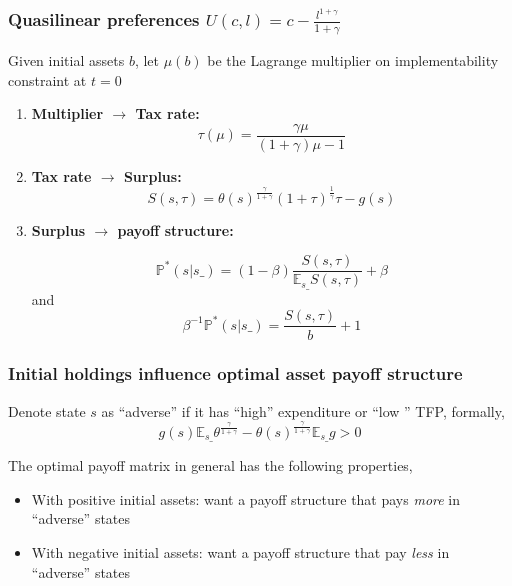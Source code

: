 \documentclass{beamer}
\newcommand{\EE}{\mathbb E}
\begin{document}
% 
\begin{frame}
\frametitle{Quasilinear preferences $U(c,l)=c-\frac{l^{1+\gamma}}{1+\gamma}$}
Given initial assets $b$,  let $\mu(b)$ be the Lagrange multiplier on implementability constraint
at $t =0$
\begin{enumerate}

 \item \textbf{Multiplier $\to$ Tax rate:}
 \[
		\tau(\mu) = \frac{\gamma\mu}{(1+\gamma)\mu-1}
	\]
 \item \textbf{Tax rate $\to$ Surplus:}
 \[
		S(s,\tau) = \theta(s)^\frac\gamma{1+\gamma}(1+\tau)^\frac1\gamma\tau-g(s)
	\]
\item \textbf{Surplus $\to$ payoff structure:}

\[
 \mathbb{P}^*(s|s\_) = (1-\beta)\frac{S(s,\tau)}{\EE_{s\_} S(s,\tau)} + \beta
 \]
and 
\[
 \beta^{-1} \mathbb{P}^*(s|s\_) = \frac{S(s,\tau)}{b} + 1
 \]

 \end{enumerate}

\end{frame}

% 
% 		
\begin{frame}		
   \frametitle{Initial holdings influence optimal asset payoff structure}
Denote state $s$ as ``adverse''  if it has ``high'' expenditure or ``low '' TFP, formally, 
\[   g(s)\EE_{s\_}\theta^\frac{\gamma}{1+\gamma}-\theta(s)^\frac\gamma{1+\gamma}\EE_{s\_} g >0\]

The optimal payoff matrix in general has the following properties,

\begin{itemize}
 \item With positive initial assets: want a payoff structure that pays {\em more} in ``adverse'' states
 \item With negative initial assets: want a payoff structure that pay {\em less} in ``adverse'' states
\end{itemize}
\end{frame}
\end{document}

